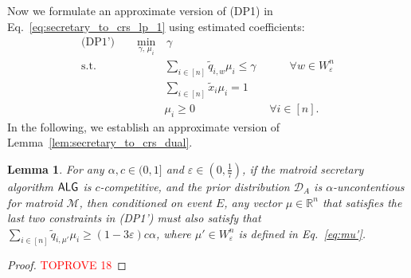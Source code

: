 \documentclass[11pt]{article}
\newcommand{\D}{\mathcal D}
\newcommand{\M}{{\mathcal M}}
\newcommand{\alg}{\textnormal{\sffamily ALG}}
\newcommand{\eps}{\varepsilon}
\newcommand{\R}{{\mathbb R}}
\newtheorem{lemma}[theorem]{Lemma}
\begin{document}
Now we formulate an approximate version of (DP1) in Eq.~\eqref{eq:secretary_to_crs_lp_1} using estimated coefficients:
\begin{align}\label{eq:approx_secretary_to_crs_dual}
    \textrm{(DP1')}\qquad\min_{\gamma,\,\mu_i}&\,\gamma\nonumber\\
    \textrm{s.t. }& \sum_{i\in[n]} \tilde{q}_{i,w}\mu_i\le\gamma \qquad\,\,\,\,\,\,\forall w\in W_{\eps}^n\nonumber\\
    & \sum_{i\in[n]}\tilde{x}_i\mu_i=1\nonumber\\
    & \mu_i\ge 0 \qquad\qquad\qquad\,\,\,\,\forall i\in [n].
\end{align}
In the following, we establish an approximate version of Lemma~\ref{lem:secretary_to_crs_dual}.
\begin{lemma}\label{lem:approx_secretary_to_crs_dual}
For any $\alpha,c\in(0,1]$ and $\eps\in\left(0,\frac{1}{7}\right)$, if the matroid secretary algorithm $\alg$ is $c$-competitive, and the prior distribution $\D_A$ is $\alpha$-uncontentious for matroid $\M$, then conditioned on event $E$, any vector $\mu\in\R^n$ that satisfies the last two constraints in (DP1') must also satisfy that $\sum_{i\in[n]} \tilde{q}_{i,\mu'}\mu_i\ge(1-3\eps)c\alpha$, where $\mu'\in W_{\eps}^n$ is defined in Eq.~\eqref{eq:mu'}.
\end{lemma}
\begin{proof}\textcolor{red}{TOPROVE 18}\end{proof}
\end{document}
